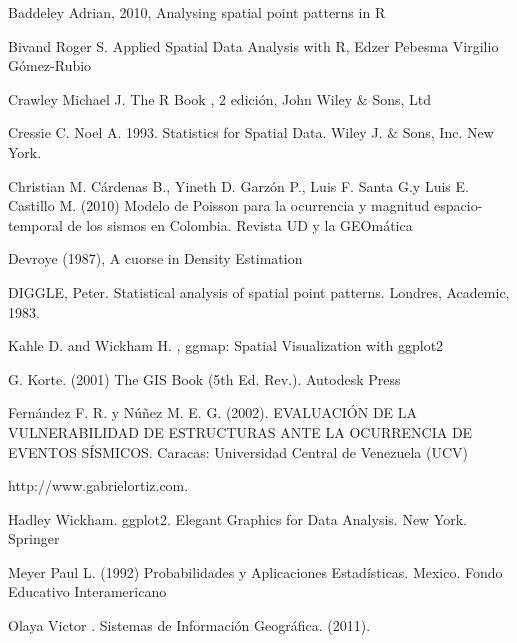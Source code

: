 \documentclass[12pt]{report}
\begin{document}
{{{{{{{{{{{{{{{		
			
		
				
			\begin{thebibliography}{}
	      	 Baddeley  Adrian, 2010, Analysing spatial point patterns in R	
	      	
	      	 Bivand  Roger S.  Applied Spatial Data Analysis with R,    Edzer Pebesma Virgilio Gómez-Rubio
	      
	      	 Crawley Michael J.  The R Book , 2 edición, John Wiley $\&$ Sons, Ltd
	      		
	      	 Cressie C. Noel A. 1993.  Statistics for Spatial Data. Wiley J. $\&$ Sons, Inc. New York.		
	      	
	      	
	      	 Christian M. Cárdenas B., Yineth D. Garzón P., Luis F. Santa G.y Luis E. Castillo M. (2010) Modelo de Poisson para la ocurrencia y magnitud espacio-temporal de los sismos en Colombia. Revista UD y la GEOmática 
	      	 
	      	 	 Devroye (1987), A cuorse in Density Estimation
	      	 
	      	   DIGGLE, Peter. Statistical analysis of spatial point patterns. Londres, Academic, 1983.
	      	
	      	               
	            Kahle D.  and  Wickham H. , ggmap: Spatial Visualization with ggplot2
       
                 G. Korte. (2001) The GIS Book (5th Ed. Rev.). Autodesk Press 
                
              Fernández F. R. y Núñez M. E. G. (2002). EVALUACIÓN DE LA VULNERABILIDAD DE ESTRUCTURAS ANTE LA OCURRENCIA DE EVENTOS SÍSMICOS.  Caracas: Universidad Central de Venezuela (UCV)
         
            http://www.gabrielortiz.com.
         
           Hadley Wickham. ggplot2. Elegant Graphics for Data Analysis.  New York. Springer
         
           Meyer Paul L. (1992) Probabilidades y Aplicaciones Estadísticas. 
           Mexico. Fondo Educativo Interamericano 
    
	     	 Olaya Victor . Sistemas de Información Geográfica. (2011).
	        

\end{thebibliography}}}}}}}}}}}}}}}}
\end{document}
